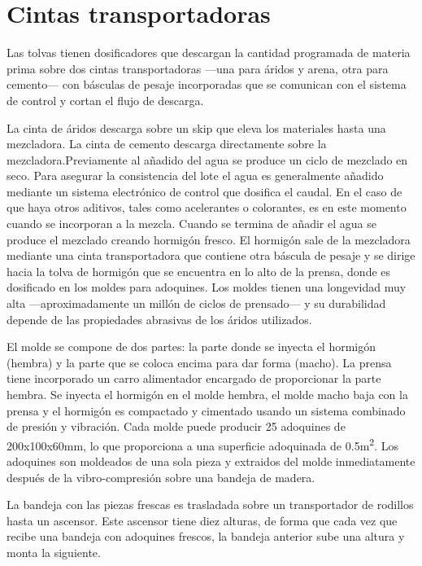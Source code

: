 \section{Cintas transportadoras}

Las tolvas tienen dosificadores que descargan la cantidad programada de materia prima sobre dos cintas transportadoras —una para áridos y arena, otra para cemento— con básculas de pesaje incorporadas que se comunican con el sistema de control y cortan el flujo de descarga.

La cinta de áridos descarga sobre un skip que eleva los materiales hasta una mezcladora. La cinta de cemento descarga directamente sobre la mezcladora.Previamente al añadido del agua se produce un ciclo de mezclado en seco. Para asegurar la consistencia del lote el agua es generalmente añadido mediante un sistema electrónico de control que dosifica el caudal. En el caso de que haya otros aditivos, tales como acelerantes o colorantes, es en este momento cuando se incorporan a la mezcla. Cuando se termina de añadir el agua se produce el mezclado creando hormigón fresco. El hormigón sale de la mezcladora mediante una cinta transportadora que contiene otra báscula de pesaje y se dirige hacia la tolva de hormigón que se encuentra en lo alto de la prensa, donde es dosificado en los moldes para adoquines. Los moldes tienen una longevidad muy alta —aproximadamente un millón de ciclos de prensado— y su durabilidad depende de las propiedades abrasivas de los áridos utilizados.

El molde se compone de dos partes: la parte donde se inyecta el hormigón (hembra) y la parte que se coloca encima para dar forma (macho). La prensa tiene incorporado un carro alimentador encargado de proporcionar la parte hembra. Se inyecta el hormigón en el molde hembra, el molde macho baja con la prensa y el hormigón es compactado y cimentado usando un sistema combinado de presión y vibración. Cada molde puede producir 25 adoquines de 200x100x60\si{\milli\meter}, lo que proporciona a una superficie adoquinada de 0.5\si{\square\meter}. Los adoquines son moldeados de una sola pieza y extraidos del molde inmediatamente después de la vibro-compresión sobre una bandeja de madera.

La bandeja con las piezas frescas es trasladada sobre un transportador de rodillos hasta un ascensor. Este ascensor tiene diez alturas, de forma que cada vez que recibe una bandeja con adoquines frescos, la bandeja anterior sube una altura y monta la siguiente.

